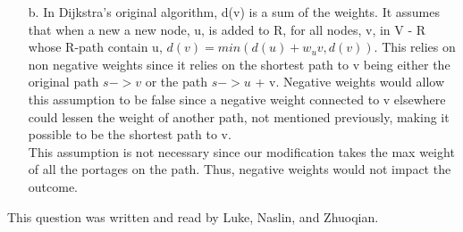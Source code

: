 \documentclass[12pt]{article}
\begin{document}
\begin{enumerate}
    \item[b.] In Dijkstra’s original algorithm, d(v) is a sum of the weights. It assumes that when a new 
    a new node, u, is added to R, for all nodes, v, in  V - R whose R-path contain u, 
    $d(v) = min(d(u) + w_uv, d(v))$. This relies on non negative weights since it relies on the shortest path
    to v being either the original path $s-> v$ or the path  $s->u$ + v. Negative weights would allow this 
    assumption to be false since a negative weight connected to v elsewhere could lessen the weight of another
    path, not mentioned previously, making it possible to be the shortest path to v.\\

    This assumption is not necessary since our modification takes the max weight of all the portages on the path.
    Thus, negative weights would not impact the outcome.\\
\end{enumerate}

This question was written and read by  Luke, Naslin, and Zhuoqian.
\newpage
\end{document}
